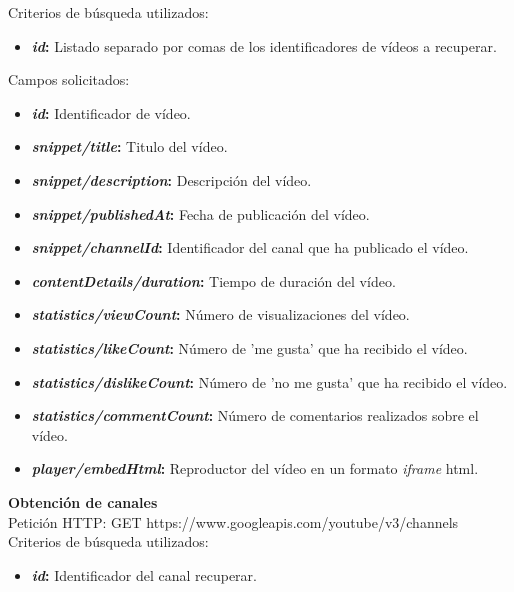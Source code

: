\documentclass[11pt,a4paper]{article}
\begin{document}
Criterios de búsqueda utilizados:
\begin{itemize}
\item \textbf{\textit{id}:} Listado separado por comas de los identificadores de vídeos a recuperar.
\end{itemize}
\pagebreak 

Campos solicitados:
\begin{itemize}
\item \textbf{\textit{id}:} Identificador de vídeo.
\item \textbf{\textit{snippet/title}:} Titulo del vídeo.
\item \textbf{\textit{snippet/description}:} Descripción del vídeo.
\item \textbf{\textit{snippet/publishedAt}:} Fecha de publicación del vídeo.
\item \textbf{\textit{snippet/channelId}:} Identificador del canal que ha publicado el vídeo.
\item \textbf{\textit{contentDetails/duration}:} Tiempo de duración del vídeo.
\item \textbf{\textit{statistics/viewCount}:} Número de visualizaciones del vídeo.
\item \textbf{\textit{statistics/likeCount}:} Número de 'me gusta' que ha recibido el vídeo.
\item \textbf{\textit{statistics/dislikeCount}:} Número de 'no me gusta' que ha recibido el vídeo.
\item \textbf{\textit{statistics/commentCount}:} Número de comentarios realizados sobre el vídeo.
\item \textbf{\textit{player/embedHtml}:} Reproductor del vídeo en un formato \textit{iframe} html.
\end{itemize}
\medskip 

\noindent\textbf{Obtención de canales}\\
Petición HTTP: GET https://www.googleapis.com/youtube/v3/channels\\

Criterios de búsqueda utilizados:
\begin{itemize}
\item \textbf{\textit{id}:} Identificador del canal recuperar.
\end{itemize}
\medskip 
\end{document}
